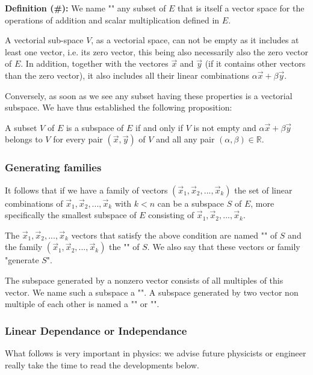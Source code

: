 	\textbf{Definition (\#\mydef):} We name "" any subset of $E$ that is itself a vector space for the operations of addition and scalar multiplication defined in $E$.
	
	A vectorial sub-space $V$, as a vectorial space, can not be empty as it includes at least one vector, i.e. its zero vector, this being also necessarily also the zero vector of $E$. In addition, together with the vectores $\vec{x}$ and $\vec{y}$ (if it contains other vectors than the zero vector), it also includes all their linear combinations $\alpha\vec{x}+\beta\vec{y}$.
	
	Conversely, as soon as we see any subset having these properties is a vectorial subspace. We have thus established the following proposition:
	
	A subset $V$ of $E$ is a subspace of $E$ if and only if $V$ is not empty and $\alpha\vec{x}+\beta\vec{y}$ belongs to $V$ for every pair $(\vec{x},\vec{y})$ of $V$ and all any pair $(\alpha,\beta) \in \mathbb{R}$.
	
	\subsubsection{Generating families}
	
	It follows that if we have a family of vectors $(\vec{x}_1,\vec{x}_2,...,\vec{x}_k)$ the set of linear combinations of $\vec{x}_1,\vec{x}_2,...,\vec{x}_k$ with $k<n$ can be a subspace $S$ of $E$, more specifically the smallest subspace of $E$ consisting of $\vec{x}_1,\vec{x}_2,...,\vec{x}_k$.
	
	The $\vec{x}_1,\vec{x}_2,...,\vec{x}_k$ vectors that satisfy the above condition are named "" of $S$ and the family $(\vec{x}_1,\vec{x}_2,...,\vec{x}_k)$ the "" of $S$. We also say that these vectors or family "generate $S$".
	
	\begin{tcolorbox}[title=Remark,colframe=black,arc=10pt]
The subspace generated by a nonzero vector consists of all multiples of this vector. We name such a subspace a "". A subspace generated by two vector non multiple of each other is named a "" or "".
	\end{tcolorbox}
	\subsubsection{Linear Dependance or Independance}
	What follows is very important in physics: we advise future physicists or engineer really take the time to read the developments below.
	
